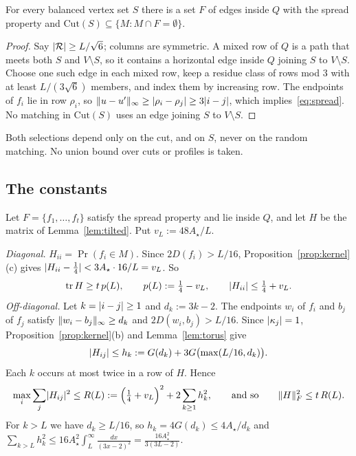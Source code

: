 \begin{lemma}\label{lem:select-vertex}
For every balanced vertex set $S$ there is a set $F$ of edges inside $Q$ with the spread property and $\mathrm{Cut}(S)\subseteq\{M:M\cap F=\emptyset\}$.
\end{lemma}

\begin{proof}
Say $\lvert \mathcal R\rvert\ge L/\sqrt6$; columns are symmetric. A mixed row of $Q$ is a path that meets both $S$ and $V\setminus S$, so it contains a horizontal edge inside $Q$ joining $S$ to $V\setminus S$. Choose one such edge in each mixed row, keep a residue class of rows mod $3$ with at least $L/(3\sqrt6)$ members, and index them by increasing row. The endpoints of $f_i$ lie in row $\rho_i$, so $\lVert u-u'\rVert_\infty\ge\lvert \rho_i-\rho_j\rvert\ge3\lvert i-j\rvert$, which implies~\eqref{eq:spread}. No matching in $\mathrm{Cut}(S)$ uses an edge joining $S$ to $V\setminus S$.
\end{proof}

Both selections depend only on the cut, and on $S$, never on the random matching. No union bound over cuts or profiles is taken.

\subsection{The constants}\label{sec:constants}

Let $F=\{f_1,\dots,f_t\}$ satisfy the spread property and lie inside $Q$, and let $H$ be the matrix of Lemma~\ref{lem:tilted}. Put $v_L:=48A_\star/L$.

\emph{Diagonal.} $H_{ii}=\Pr(f_i\in M)$. Since $2D(f_i)>L/16$, Proposition~\ref{prop:kernel}(c) gives $\lvert H_{ii}-\frac14\rvert<3A_\star\cdot16/L=v_L$. So
\[
  \operatorname{tr} H\ge t\,p(L),\qquad p(L):=\tfrac14-v_L,\qquad \lvert H_{ii}\rvert\le\tfrac14+v_L .
\]
\emph{Off-diagonal.} Let $k=\lvert i-j\rvert\ge1$ and $d_k:=3k-2$. The endpoints $w_i$ of $f_i$ and $b_j$ of $f_j$ satisfy $\lVert w_i-b_j\rVert_\infty\ge d_k$ and $2D(w_i,b_j)>L/16$. Since $\lvert \kappa_j\rvert=1$, Proposition~\ref{prop:kernel}(b) and Lemma~\ref{lem:torus} give
\[
  \lvert H_{ij}\rvert\le h_k:=G(d_k)+3G\bigl(\max(L/16,d_k)\bigr).
\]
Each $k$ occurs at most twice in a row of $H$. Hence
\[
  \max_i\sum_j\lvert H_{ij}\rvert^2\le R(L):=\Bigl(\tfrac14+v_L\Bigr)^2+2\sum_{k\ge1}h_k^2,\qquad\text{and so}\qquad\lVert H\rVert_F^2\le t\,R(L).
\]
For $k>L$ we have $d_k\ge L/16$, so $h_k=4G(d_k)\le4A_\star/d_k$ and $\sum_{k>L}h_k^2\le16A_\star^2\int_L^\infty\frac{dx}{(3x-2)^2}=\frac{16A_\star^2}{3(3L-2)}$.

